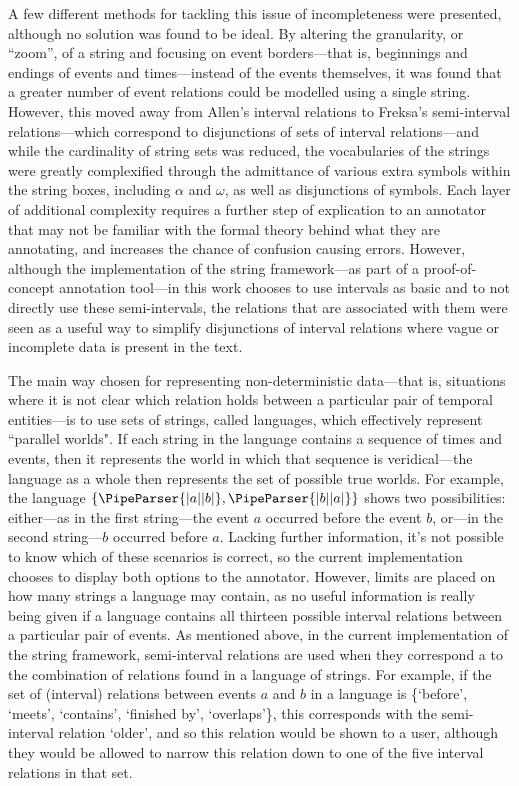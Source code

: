 \documentclass[a4paper,12pt,leqno,twoside]{article}
\newcommand{\vph}[1]{\vphantom{#1}}
\newcommand{\ebox}[1]{\fbox{$\vph{'(),}#1$}}
\newcommand{\EventString}[1]{%
	\renewcommand*{\do}[1]{\ebox{##1}}%
	\PipeParser{#1}%
}
\begin{document}
A few different methods for tackling this issue of incompleteness were presented, although no solution was found to be ideal. By altering the granularity, or ``zoom'', of a string and focusing on event borders---that is, beginnings and endings of events and times---instead of the events themselves, it was found that a greater number of event relations could be modelled using a single string. However, this moved away from Allen's interval relations to Freksa's semi-interval relations---which correspond to disjunctions of sets of interval relations---and while the cardinality of string sets was reduced, the vocabularies of the strings were greatly complexified through the admittance of various extra symbols within the string boxes, including $\alpha$ and $\omega$, as well as disjunctions of symbols. Each layer of additional complexity requires a further step of explication to an annotator that may not be familiar with the formal theory behind what they are annotating, and increases the chance of confusion causing errors. However, although the implementation of the string framework---as part of a proof-of-concept annotation tool---in this work chooses to use intervals as basic and to not directly use these semi-intervals, the relations that are associated with them were seen as a useful way to simplify disjunctions of interval relations where vague or incomplete data is present in the text.

The main way chosen for representing non-deterministic data---that is, situations where it is not clear which relation holds between a particular pair of temporal entities---is to use sets of strings, called languages, which effectively represent ``parallel worlds". If each string in the language contains a sequence of times and events, then it represents the world in which that sequence is veridical---the language as a whole then represents the set of possible true worlds. For example, the language $\{\EventString{{}|a|{}|b|{}}, \EventString{{}|b|{}|a|{}}\}$ shows two possibilities: either---as in the first string---the event $a$ occurred before the event $b$, or---in the second string---$b$ occurred before $a$. Lacking further information, it's not possible to know which of these scenarios is correct, so the current implementation chooses to display both options to the annotator. However, limits are placed on how many strings a language may contain, as no useful information is really being given if a language contains all thirteen possible interval relations between a particular pair of events. As mentioned above, in the current implementation of the string framework, semi-interval relations are used when they correspond a to the combination of relations found in a language of strings. For example, if the set of (interval) relations between events $a$ and $b$ in a language is \{`before', `meets', `contains', `finished by', `overlaps'\}, this corresponds with the semi-interval relation `older', and so this relation would be shown to a user, although they would be allowed to narrow this relation down to one of the five interval relations in that set.
\end{document}
